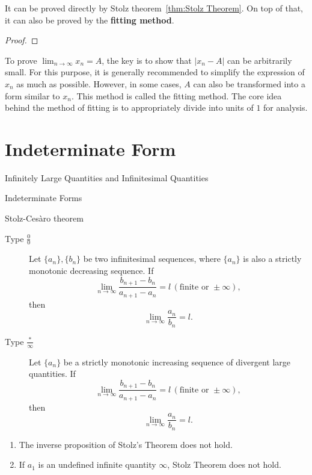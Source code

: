 \documentclass[11pt]{../../TexTemplate/elegantbook}
\begin{document}
It can be proved directly by Stolz theorem~\ref{thm:Stolz Theorem}.
On top of that, it can also be proved by the \textbf{fitting method}.

\begin{proof}
    
\end{proof}

\begin{remark}
    To prove \(\lim_{n \to \infty} x_n = A\), 
    the key is to show that \(|x_n - A|\) can be arbitrarily small. 
    For this purpose, it is generally recommended to simplify the expression of \(x_n\) as much as possible. 
    However, in some cases, \(A\) can also be transformed into a form similar to \(x_n\). 
    This method is called the fitting method. 
    The core idea behind the method of fitting is to appropriately divide into units of \(1\) for analysis.
\end{remark}



\section{Indeterminate Form}
\begin{leftbarTitle}{Infinitely Large Quantities and Infinitesimal Quantities}\end{leftbarTitle}

\begin{leftbarTitle}{Indeterminate Forms}\end{leftbarTitle}

\begin{theorem}{Stolz-Cesàro theorem}\label{thm:Stolz Theorem}
    \begin{description}
        \item[Type \(\frac{0}{0}\)] Let \(\{a_n\}, \{b_n\}\) be two infinitesimal sequences, 
            where \(\{a_n\}\) is also a strictly monotonic decreasing sequence. If  
            \[
            \lim_{n \to \infty} \frac{b_{n+1} - b_n}{a_{n+1} - a_n} = l \, (\text{finite or } \pm\infty),
            \]  
            then  
            \[
            \lim_{n \to \infty} \frac{a_n}{b_n} = l.
            \] 
        \item[Type \(\frac{\text{*}}{\infty}\)] Let \(\{a_n\}\) be a strictly monotonic increasing sequence 
            of divergent large quantities. If  
            \[
            \lim_{n \to \infty} \frac{b_{n+1} - b_n}{a_{n+1} - a_n} = l \, (\text{finite or } \pm\infty),
            \]  
            then  
            \[
            \lim_{n \to \infty} \frac{a_n}{b_n} = l.
            \]
    \end{description}
\end{theorem}
\begin{note}
    \begin{enumerate}
        \item The inverse proposition of Stolz's Theorem does not hold.
        \item If \(a_1\) is an undefined infinite quantity \(\infty\), Stolz Theorem does not hold.
    \end{enumerate}
\end{note}
\end{document}
